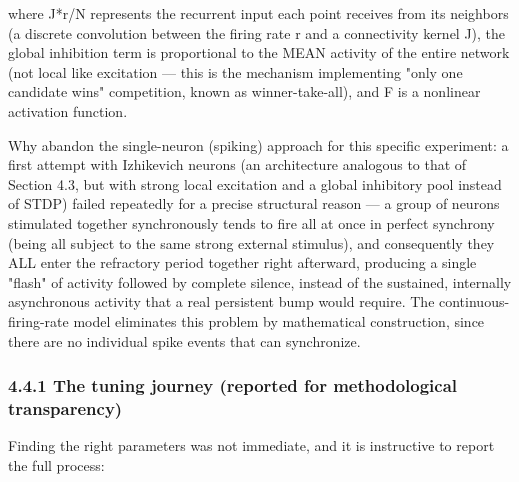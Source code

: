 \documentclass[
  english,
]{article}
\begin{document}
where J*r/N represents the recurrent input each point receives from its neighbors (a discrete convolution between the firing rate r and a connectivity kernel J), the global inhibition term is proportional to the MEAN activity of the entire network (not local like excitation --- this is the mechanism implementing "only one candidate wins" competition, known as winner-take-all), and F is a nonlinear activation function.

Why abandon the single-neuron (spiking) approach for this specific experiment: a first attempt with Izhikevich neurons (an architecture analogous to that of Section 4.3, but with strong local excitation and a global inhibitory pool instead of STDP) failed repeatedly for a precise structural reason --- a group of neurons stimulated together synchronously tends to fire all at once in perfect synchrony (being all subject to the same strong external stimulus), and consequently they ALL enter the refractory period together right afterward, producing a single "flash" of activity followed by complete silence, instead of the sustained, internally asynchronous activity that a real persistent bump would require. The continuous-firing-rate model eliminates this problem by mathematical construction, since there are no individual spike events that can synchronize.

\subsubsection{4.4.1 The tuning journey (reported for methodological transparency)}\label{the-tuning-journey-reported-for-methodological-transparency}

Finding the right parameters was not immediate, and it is instructive to report the full process:
\end{document}
